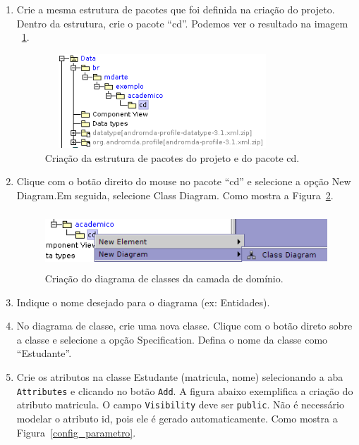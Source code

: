 \begin{enumerate}
\item Crie a mesma estrutura de pacotes que foi definida na criação do projeto.
Dentro da estrutura, crie o pacote “cd”. Podemos ver o resultado na imagem
~\ref{cria_estrutura_pacotes}. 
\begin{figure}[H]
	\centering
	\includegraphics[width=250pt,height=100pt]{imgs/tutorial-mdarte-0000.png}
	\caption{Criação da estrutura de pacotes do projeto e do pacote cd.}
	\label{cria_estrutura_pacotes}
\end{figure}
\item Clique com o botão direito do mouse no pacote “cd” e selecione a opção New
Diagram.Em seguida, selecione Class Diagram. Como mostra a
Figura~\ref{cria_diagrama_classe}.
\begin{figure}[H]
	\centering
	\includegraphics[width=400pt,height=60pt]{imgs/tutorial-mdarte-0001.png}
	\caption{Criação do diagrama de classes da camada de domínio.}
	\label{cria_diagrama_classe}
\end{figure}
	
\item Indique o nome desejado para o diagrama (ex: Entidades).
	
\item No diagrama de classe, crie uma nova classe. Clique com o botão direto
sobre a classe e selecione a opção Specification. Defina o nome da classe como
“Estudante”.
	
\item Crie os atributos na classe Estudante (matricula, nome) selecionando a aba
\texttt{Attributes} e clicando no botão \texttt{Add}. A figura abaixo exemplifica a criação do
atributo matricula. O campo \texttt{Visibility} deve ser \texttt{public}. Não é necessário modelar
o atributo id, pois ele é gerado automaticamente. Como mostra a
Figura~\ref{config_parametro}.


\end{enumerate}

